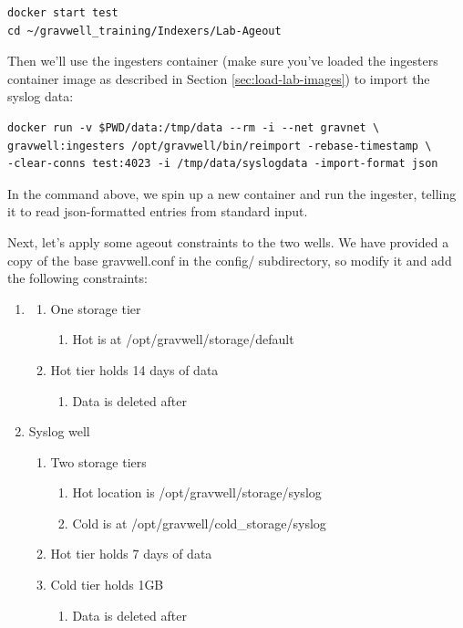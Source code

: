 {{\begin{Verbatim}[breaklines=true]
docker start test
cd ~/gravwell_training/Indexers/Lab-Ageout
\end{Verbatim}

Then we'll use the ingesters container (make sure you've loaded the ingesters container image as described in Section \ref{sec:load-lab-images}) to import the syslog data:
\begin{Verbatim}[breaklines=true]
docker run -v $PWD/data:/tmp/data --rm -i --net gravnet \
gravwell:ingesters /opt/gravwell/bin/reimport -rebase-timestamp \
-clear-conns test:4023 -i /tmp/data/syslogdata -import-format json
\end{Verbatim}


In the command above, we spin up a new container and run the  ingester, telling it to read json-formatted entries from standard input.

Next, let's apply some ageout constraints to the two wells. We have provided a copy of the
base gravwell.conf in the config/ subdirectory, so modify it and add the following constraints:

\begin{enumerate}
	\item {}
	\begin{enumerate}
		\item{One storage tier}
		\begin{enumerate}
			\item Hot is at /opt/gravwell/storage/default
		\end{enumerate}
		\item Hot tier holds 14 days of data
		\begin{enumerate}
			\item Data is deleted after
		\end{enumerate}
	\end{enumerate}
	\item Syslog well
	\begin{enumerate}
		\item Two storage tiers
		\begin{enumerate}
			\item Hot location is /opt/gravwell/storage/syslog
			\item Cold is at /opt/gravwell/cold\_storage/syslog
		\end{enumerate}
		\item Hot tier holds 7 days of data
		\item Cold tier holds 1GB
		\begin{enumerate}
			\item Data is deleted after
		\end{enumerate}
	\end{enumerate}
\end{enumerate}

}}
